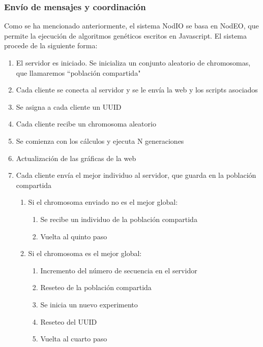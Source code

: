 \documentclass[runningheads,a4paper]{llncs}
\begin{document}
\subsubsection{Env\'io de mensajes y coordinaci\'on}
Como se ha mencionado anteriormente, el sistema NodIO se basa en NodEO, que permite la
ejecuci\'on de algoritmos gen\'eticos escritos en Javascript. El sistema procede
de la siguiente forma:
\begin{enumerate}
  \item El servidor es iniciado. Se inicializa un conjunto aleatorio de chromosomas,
  que llamaremos ``poblaci\'on compartida"
  \item Cada cliente se conecta al servidor y se le env\'ia la web y los scripts asociados
  \item Se asigna a cada cliente un UUID
  \item Cada cliente recibe un chromosoma aleatorio
  \item Se comienza con los c\'alculos
  y ejecuta N generaciones
  \item Actualizaci\'on de las gr\'aficas de la web
  \item Cada cliente env\'ia el mejor individuo al servidor, que guarda en la poblaci\'on compartida
  \begin{enumerate}
    \item Si el chromosoma enviado no es el mejor global:
      \begin{enumerate}
        \item Se recibe un individuo de la poblaci\'on compartida
        \item Vuelta al quinto paso
      \end{enumerate}
    \item Si el chromosoma es el mejor global:
      \begin{enumerate}
        \item Incremento del n\'umero de secuencia en el servidor
        \item Reseteo de la poblaci\'on compartida
        \item Se inicia un nuevo experimento
        \item Reseteo del UUID
        \item Vuelta al cuarto paso
      \end{enumerate}
  \end{enumerate}
\end{enumerate}
\end{document}
